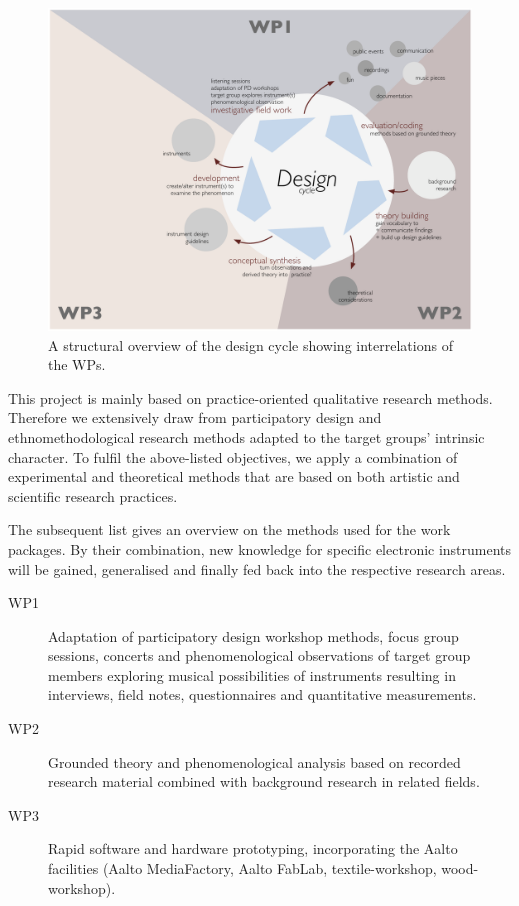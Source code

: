 \documentclass{chi-ext}
\begin{document}
\begin{multicols}{2}
\begin{figure}
	\includegraphics[width=\columnwidth]{media/DEINDDesignCycle.pdf}
	\caption{A structural overview of the design cycle showing interrelations of the WPs.}
	\label{fig:Designcycle}
\end{figure}

This project is mainly based on practice-oriented qualitative research methods. 
Therefore we extensively draw from participatory design and ethnomethodological research methods adapted to the target groups’ intrinsic character. 
To fulfil the above-listed objectives, we apply a combination of experimental and theoretical methods that are based on both artistic and scientific research practices. 


The subsequent list gives an overview on the methods used for the work packages. 
By their combination, new knowledge for specific electronic instruments will be gained, generalised and finally fed back into the respective research areas.

\begin{description}
	\item[WP1] Adaptation of participatory design workshop methods, focus group sessions, concerts and phenomenological observations of target group members exploring musical possibilities of instruments resulting in interviews, field notes, questionnaires and quantitative measurements.
	\item[WP2] Grounded theory and phenomenological analysis based on recorded research material combined with background research in related fields.
	\item[WP3] Rapid software and hardware prototyping, incorporating the Aalto facilities (Aalto MediaFactory, Aalto FabLab, textile-workshop, wood-workshop).
\end{description}


\end{multicols}
\end{document}
